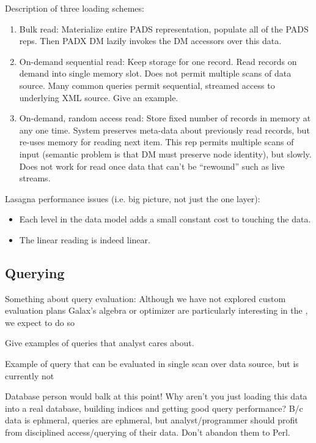 Description of three loading schemes:


\begin{enumerate}
\item Bulk read: Materialize entire PADS representation, populate all
  of the PADS reps.  Then PADX DM lazily invokes the DM accessors over
  this data.

\item On-demand sequential read: Keep storage for one record. Read
  records on demand into single memory slot. Does not permit multiple
  scans of data source.  Many common queries permit sequential,
  streamed access to underlying XML source.  Give an example.

\item On-demand, random access read: Store fixed number of records in
  memory at any one time. System preserves
  meta-data about previously read records, but re-uses memory for
  reading next item.  This rep permits multiple scans of input
  (semantic problem is that DM must preserve node identity), but
  slowly. Does not work for read once data that can't be ``rewound''
  such as live streams.
\end{enumerate}

Lasagna performance issues (i.e. big picture, not just the one layer):

\begin{itemize}
\item Each level
in the data model adds a small constant cost to touching
the data.
\item The linear reading is indeed linear.
\end{itemize}

\subsection{Querying}

Something about query evaluation:
Although we have not explored custom evaluation plans 
Galax's algebra or optimizer are particularly interesting in the 
\padx{}, we expect to do so 

Give examples of queries that analyst cares about. 

Example of query that can be evaluated in single scan over data
source, but is currently not 

Database person would balk at this point!  Why aren't you just loading
this data into a real database, building indices and getting good
query performance?  B/c data is ephmeral, queries are ephmeral, but
analyst/programmer should profit from disciplined access/querying of
their data.  Don't abandon them to Perl. 

